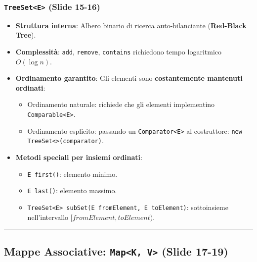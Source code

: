 \documentclass[11pt,a4paper,oneside]{report}
\newcommand{\passthrough}[1]{#1}
\providecommand{\tightlist}{\setlength{\itemsep}{0pt}\setlength{\parskip}{0pt}}
\begin{document}
\subsubsection{\texorpdfstring{\texttt{TreeSet\textless{}E\textgreater{}}
(Slide
15-16)}{TreeSet\textless E\textgreater{} (Slide 15-16)}}\label{chap15_treesete-slide-15-16}

\begin{itemize}
\tightlist
\item
  \textbf{Struttura interna}: Albero binario di ricerca auto-bilanciante
  (\textbf{Red-Black Tree}).
\item
  \textbf{Complessità}: \passthrough{\lstinline!add!},
  \passthrough{\lstinline!remove!}, \passthrough{\lstinline!contains!}
  richiedono tempo logaritmico \textbf{\(O(\log n)\)}.
\item
  \textbf{Ordinamento garantito}: Gli elementi sono
  \textbf{costantemente mantenuti ordinati}:

  \begin{itemize}
  \tightlist
  \item
    Ordinamento naturale: richiede che gli elementi implementino
    \passthrough{\lstinline!Comparable<E>!}.
  \item
    Ordinamento esplicito: passando un
    \passthrough{\lstinline!Comparator<E>!} al costruttore:
    \passthrough{\lstinline!new TreeSet<>(comparator)!}.
  \end{itemize}
\item
  \textbf{Metodi speciali per insiemi ordinati}:

  \begin{itemize}
  \tightlist
  \item
    \passthrough{\lstinline!E first()!}: elemento minimo.
  \item
    \passthrough{\lstinline!E last()!}: elemento massimo.
  \item
    \passthrough{\lstinline!TreeSet<E> subSet(E fromElement, E toElement)!}:
    sottoinsieme nell'intervallo \([fromElement, toElement)\).
  \end{itemize}
\end{itemize}

\begin{center}\rule{0.5\linewidth}{0.5pt}\end{center}

\subsection{\texorpdfstring{Mappe Associative:
\texttt{Map\textless{}K,\ V\textgreater{}} (Slide
17-19)}{Mappe Associative: Map\textless K, V\textgreater{} (Slide 17-19)}}\label{chap15_mappe-associative-mapk-v-slide-17-19}
\end{document}
